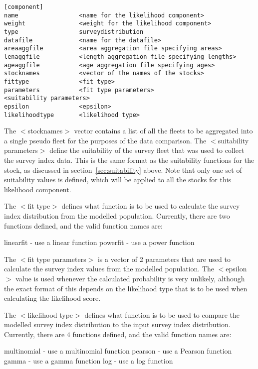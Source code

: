 \documentclass[10pt,twoside]{book}
\begin{document}
{\small\begin{verbatim}
[component]
name                 <name for the likelihood component>
weight               <weight for the likelihood component>
type                 surveydistribution
datafile             <name for the datafile>
areaaggfile          <area aggregation file specifying areas>
lenaggfile           <length aggregation file specifying lengths>
ageaggfile           <age aggregation file specifying ages>
stocknames           <vector of the names of the stocks>
fittype              <fit type>
parameters           <fit type parameters>
<suitability parameters>
epsilon              <epsilon>
likelihoodtype       <likelihood type>
\end{verbatim}}

The $<$stocknames$>$ vector contains a list of all the fleets to be aggregated into a single pseudo fleet for the purposes of the data comparison.  The $<$suitability parameters$>$ define the suitability of the survey fleet that was used to collect the survey index data.  This is the same format as the suitability functions for the stock, as discussed in section~\ref{sec:suitability} above.  Note that only one set of suitability values is defined, which will be applied to all the stocks for this likelihood component.

\bigskip
The $<$fit type$>$ defines what function is to be used to calculate the survey index distribution from the modelled population.  Currently, there are two functions defined, and the valid function names are:

\bigskip
linearfit - use a linear function\newline
powerfit - use a power function

\bigskip
The $<$fit type parameters$>$ is a vector of 2 parameters that are used to calculate the survey index values from the modelled population.  The $<$epsilon$>$ value is used whenever the calculated probability is very unlikely, although the exact format of this depends on the likelihood type that is to be used when calculating the likelihood score.

\bigskip
The $<$likelihood type$>$ defines what function is to be used to compare the modelled survey index distribution to the input survey index distribution.  Currently, there are 4 functions defined, and the valid function names are:

\bigskip
multinomial - use a multinomial function\newline
pearson - use a Pearson function\newline
gamma - use a gamma function\newline
log - use a log function
\end{document}
